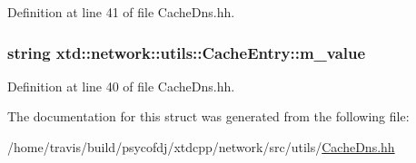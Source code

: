 Definition at line 41 of file Cache\-Dns.\-hh.

\hypertarget{structxtd_1_1network_1_1utils_1_1CacheEntry_abbe786f1da8194495f1e36d8de8ba0b3}{
\subsubsection[{m\-\_\-value}]{\setlength{\rightskip}{0pt plus 5cm}string xtd\-::network\-::utils\-::\-Cache\-Entry\-::m\-\_\-value}}\label{structxtd_1_1network_1_1utils_1_1CacheEntry_abbe786f1da8194495f1e36d8de8ba0b3}


Definition at line 40 of file Cache\-Dns.\-hh.



The documentation for this struct was generated from the following file\-:\begin{DoxyCompactItemize}
\item 
/home/travis/build/psycofdj/xtdcpp/network/src/utils/\hyperlink{CacheDns_8hh}{Cache\-Dns.\-hh}\end{DoxyCompactItemize}

